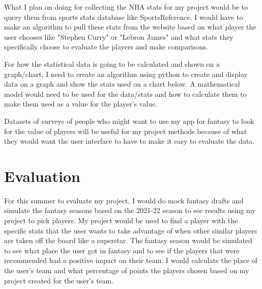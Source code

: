 \documentclass[10pt,twocolumn]{article}
\begin{document}
What I plan on doing for collecting the NBA stats for my project would be to query them from sports stats database like SportsReference. I would have to make an algorithm to pull these stats from the website based on what player the user chooses like "Stephen Curry" or "Lebron James" and what stats they specifically choose to evaluate the players and make comparisons.

For how the statistical data is going to be calculated and shown on a graph/chart, I need to create an algorithm using python to create and display data on a graph and show the stats used on a chart below. A mathematical model would need to be used for the data/stats and how to calculate them to make them used as a value for the player's value.

Datasets of surveys of people who might want to use my app for fantasy to look for the value of players will be useful for my project methods because of what they would want the user interface to have to make it easy to evaluate the data. 


\section{Evaluation}

For this summer to evaluate my project, I would do mock fantasy drafts and simulate the fantasy seasons based on the 2021-22 season to see results using my project to pick players. My project would be used to find a player with the specific stats that the user wants to take advantage of when other similar players are taken off the board like a superstar. The fantasy season would be simulated to see what place the user got in fantasy and to see if the players that were recommended had a positive impact on their team. I would calculate the place of the user's team and what percentage of points the players chosen based on my project created for the user's team. 

\printbibliography 
\end{document}
